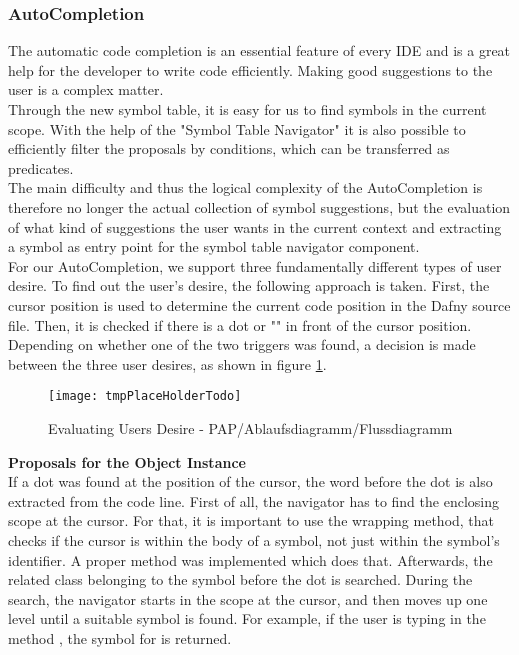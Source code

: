 \subsubsection{AutoCompletion}
\label{section:implementation:core:completion}
The automatic code completion is an essential feature of every IDE and is a great help for the developer to write code efficiently.
Making good suggestions to the user is a complex matter. \\

Through the new symbol table, it is easy for us to find symbols in the current scope.
With the help of the "Symbol Table Navigator"
it is also possible to efficiently filter the proposals by conditions,
which can be transferred as predicates. \\

The main difficulty and thus the logical complexity of the AutoCompletion
is therefore no longer the actual collection of symbol suggestions,
but the evaluation of what kind of suggestions the user wants in the current context
and extracting a symbol as entry point for the symbol table navigator component. \\

For our AutoCompletion, we support three fundamentally different types of user desire.
To find out the user's desire, the following approach is taken.
First, the cursor position is used to determine the current code position in the Dafny source file.
Then, it is checked if there is a dot or "" in front of the cursor position.
Depending on whether one of the two triggers was found,
a decision is made between the three user desires, as shown in figure \ref{fig:get_users_desire}.

\begin{figure}[H]
    \centering
    \texttt{[image: tmpPlaceHolderTodo]}
    \caption{Evaluating Users Desire - PAP/Ablaufsdiagramm/Flussdiagramm}
    \label{fig:get_users_desire}
\end{figure}

\textbf{Proposals for the Object Instance}\\
If a dot was found at the position of the cursor, the word before the dot is also extracted from the code line.
First of all, the navigator has to find the enclosing scope at the cursor.
For that, it is important to use the wrapping method, that checks if the cursor is within the body of a symbol, not just within the symbol's identifier.
A proper method was implemented which does that.
Afterwards, the related class belonging to the symbol before the dot is searched.
During the search, the navigator starts in the scope at the cursor, and then moves up one level until a suitable symbol is found.
For example, if the user is typing in the method , the symbol for  is returned. \\

